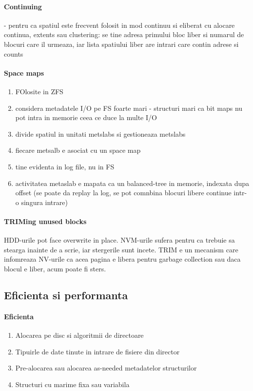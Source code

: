 \documentclass{article}
\begin{document}
\paragraph*{Continuing} - pentru ca spatiul este frecvent folosit in mod continuu si eliberat cu alocare continua, extents sau clustering: se tine adresa primului bloc liber si numarul de blocuri care il urmeaza, iar lista spatiului liber are intrari care contin adrese si counts

\paragraph*{Space maps}
\begin{enumerate}
    \item FOlosite in ZFS
    \item considera metadatele I/O pe FS foarte mari - structuri mari ca bit maps nu pot intra in memorie ceea ce duce la multe I/O
    \item divide spatiul in unitati metslabs si gestioneaza metslabs
    \item fiecare metsalb e asociat cu un space map
    \item tine evidenta in log file, nu in FS
    \item activitatea metaslab e mapata ca un balanced-tree in memorie, indexata dupa offset (se poate da replay la log, se pot comnbina blocuri libere continue intr-o singura intrare)
\end{enumerate}

\paragraph*{TRIMing unused blocks}
HDD-urile pot face overwrite in place. NVM-urile sufera pentru ca trebuie sa stearga inainte de a scrie, iar stergerile sunt incete. TRIM e un mecanism care infomreaza NV-urile ca acea pagina e libera pentru garbage collection sau daca blocul e liber, acum poate fi sters.

\subsection*{Eficienta si performanta}
\paragraph*{Eficienta}
\begin{enumerate}
    \item Alocarea pe disc si algoritmii de directoare
    \item Tipuirle de date tinute in intrare de fisiere din director
    \item Pre-alocarea sau alocarea as-needed metadatelor structurilor
    \item Structuri cu marime fixa sau variabila
\end{enumerate}
\end{document}

